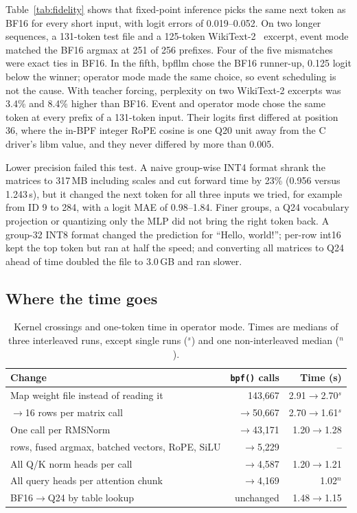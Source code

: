 \documentclass[sigconf,nonacm]{acmart}
\begin{document}
Table~\ref{tab:fidelity} shows that fixed-point inference picks the same next
token as BF16 for every short input, with logit errors of 0.019--0.052. On
two longer sequences, a 131-token test file and a 125-token
WikiText-2~\cite{wikitext} excerpt, event mode matched the BF16 argmax at 251
of 256 prefixes. Four of the five mismatches were exact ties in BF16. In the
fifth, bpfllm chose the BF16 runner-up, 0.125 logit below the winner;
operator mode made the same choice, so event scheduling is not the cause.
With teacher forcing, perplexity on two WikiText-2 excerpts was 3.4\% and
8.4\% higher than BF16. Event and operator mode chose the same token at every
prefix of a 131-token input. Their logits first differed at position 36,
where the in-BPF integer RoPE cosine is one Q20 unit away from the C driver's
libm value, and they never differed by more than 0.005.

Lower precision failed this test. A naive group-wise INT4 format shrank the
matrices to 317\,MB including scales and cut forward time by 23\% (0.956
versus 1.243\,s), but it changed the next token for all three inputs we
tried, for example from ID 9 to 284, with a logit MAE of 0.98--1.84. Finer
groups, a Q24 vocabulary projection or quantizing only the MLP did not bring
the right token back. A group-32 INT8 format changed the prediction for
``Hello, world!''; per-row int16 kept the top token but ran at half the
speed; and converting all matrices to Q24 ahead of time doubled the file to
3.0\,GB and ran slower.

\subsection{Where the time goes}

\begin{table}[t]
\centering
\small
\caption{Kernel crossings and one-token time in operator mode. Times are
medians of three interleaved runs, except single runs ($^s$) and one
non-interleaved median ($^n$).}
\label{tab:crossings}
\begin{tabular}{@{}>{\raggedright\arraybackslash}p{}rr@{}}
\toprule
Change & \texttt{bpf()} calls & Time (s) \\
\midrule
Map weight file instead of reading it & 143,667 & 2.91$\to$2.70$^s$ \\
4$\to$16 rows per matrix call & $\to$50,667 & 2.70$\to$1.61$^s$ \\
One call per RMSNorm & $\to$43,171 & 1.20$\to$1.28 \\
128 rows, fused argmax, batched vectors, RoPE, SiLU & $\to$5,229 & -- \\
All Q/K norm heads per call & $\to$4,587 & 1.20$\to$1.21 \\
All query heads per attention chunk & $\to$4,169 & 1.02$^n$ \\
\midrule
BF16$\to$Q24 by table lookup & unchanged & 1.48$\to$1.15 \\
\bottomrule
\end{tabular}
\end{table}
\end{document}
